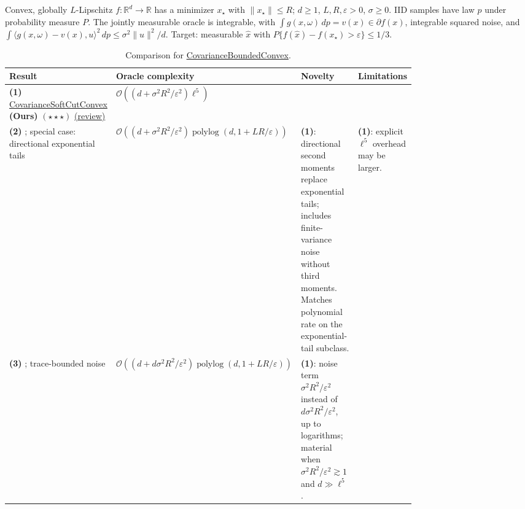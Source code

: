 \begin{table}[tp]
\centering
\caption{Comparison for \href{https://github.com/k3nfalt/longtails/blob/main/LongTails/Setups/CovarianceBoundedConvex.lean}{CovarianceBoundedConvex}.}\label{tab:CovarianceBoundedConvex}
\parbox{\linewidth}{\footnotesize Convex, globally $L$-Lipschitz $f:\mathbb{R}^d\to\mathbb{R}$ has a minimizer $x_\star$ with $\|x_\star\|\le R$; $d\ge1$, $L,R,\varepsilon>0$, $\sigma\ge0$. IID samples have law $p$ under probability measure $P$. The jointly measurable oracle is integrable, with $\int g(x,\omega)\,dp=v(x)\in\partial f(x)$, integrable squared noise, and $\int\langle g(x,\omega)-v(x),u\rangle^2\,dp\le\sigma^2\|u\|^2/d$. Target: measurable $\hat x$ with $P\{f(\hat x)-f(x_\star)>\varepsilon\}\le1/3$.}\par\smallskip
\begin{threeparttable}
\footnotesize
\setlength{\tabcolsep}{4pt}\renewcommand{\arraystretch}{1.25}
\begin{tabularx}{\linewidth}{@{}>{\raggedright\arraybackslash}p{0.20\linewidth}>{\raggedright\arraybackslash}p{0.32\linewidth}>{\raggedright\arraybackslash}p{0.25\linewidth}>{\raggedright\arraybackslash}X@{}}
\toprule
\textbf{Result} & \textbf{Oracle complexity} & \textbf{Novelty} & \textbf{Limitations} \\
\midrule
\textbf{(1)} \href{https://github.com/k3nfalt/longtails/blob/main/LongTails/Theorems/CovarianceSoftCutConvex.lean}{Covariance\allowbreak Soft\allowbreak Cut\allowbreak Convex} \textbf{(Ours)} $(\star\star\star)$ \href{https://github.com/k3nfalt/longtails/blob/main/scripts/reviews/CovarianceSoftCutConvex.md}{(review)}
& $\mathcal{O}((d+\sigma^2R^2/\varepsilon^2)\ell^5)$ & & \\
\midrule[1.2pt]
\textbf{(2)} \citep[Cor.~3, v1]{covMOSZ2025v1}; special case: directional exponential tails
& $\mathcal{O}((d+\sigma^2R^2/\varepsilon^2)\operatorname{polylog}(d,1+LR/\varepsilon))$
& \textbf{(1)}: directional second moments replace exponential tails; includes finite-variance noise without third moments. Matches polynomial rate on the exponential-tail subclass.
& \textbf{(1)}: explicit $\ell^5$ overhead may be larger. \\
\midrule
\textbf{(3)} \citep[Cor.~4, v1]{covMOSZ2025v1}; trace-bounded noise
& $\mathcal{O}((d+d\sigma^2R^2/\varepsilon^2)\operatorname{polylog}(d,1+LR/\varepsilon))$
& \textbf{(1)}: noise term $\sigma^2R^2/\varepsilon^2$ instead of $d\sigma^2R^2/\varepsilon^2$, up to logarithms; material when $\sigma^2R^2/\varepsilon^2\gtrsim1$ and $d\gg\ell^5$.

\end{tabularx}
\end{threeparttable}
\end{table}
